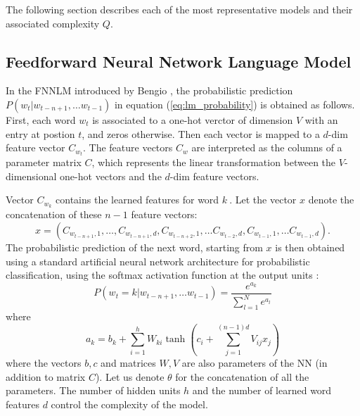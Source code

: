 The following section describes each of the most representative  models and their
associated complexity $Q$.



\subsection{Feedforward Neural Network Language Model}
\label{subsec:fwd-neural-net-lm}


In the \ac{FNNLM} introduced by Bengio
\cite{Bengio:2003:NPL:944919.944966},  the probabilistic prediction $P(w_t | w_{t-n+1}, \ldots w_{t-1})$ 
in equation (\ref{eq:lm_probability}) is obtained as follows. 
First, each word $w_t$ is associated to a one-hot verctor of dimension $V$ with an entry at postion $t$, and zeros otherwise.  Then each vector is mapped to a $d$-dim feature vector $C_{w_t}$. The feature vectors $C_w$ are interpreted as the columns of a parameter matrix $C$, which represents the linear transformation between the $V$-dimensional one-hot vectors and the $d$-dim feature vectors. 

Vector $C_{w_{k}}$ contains the learned features for word $k\ .$
Let the  vector $x$ denote the concatenation of these $n-1$
feature vectors:
\begin{equation}
  x = (C_{w_{t-n+1},1}, \ldots, C_{w_{t-n+1},d}, C_{w_{t-n+2},1}, \ldots C_{w_{t-2},d}, C_{w_{t-1},1}, \ldots C_{w_{t-1},d}).
\end{equation}
The probabilistic prediction of the next word, starting from $x$
is then obtained using a standard artificial neural network architecture
for probabilistic classification, using the softmax activation function at the output units \cite{Bishop:1995:NNP:525960}:
\begin{equation}
 P(w_t=k | w_{t-n+1}, \ldots w_{t-1}) = \frac{e^{a_k}}{\sum_{l=1}^N e^{a_l}}
\end{equation}
where
\begin{equation}
 a_k = b_k + \sum_{i=1}^h W_{ki} \tanh(c_i + \sum_{j=1}^{(n-1)d} V_{ij} x_j)
\end{equation}
where the vectors $b,c$ and matrices $W,V$ are also
parameters of the \ac{NN}  (in addition to matrix $C$). Let us denote
$\theta$ for the concatenation of all the parameters.
The number of hidden units $h$
and the number of learned word features $d$  control the  complexity of the model.


